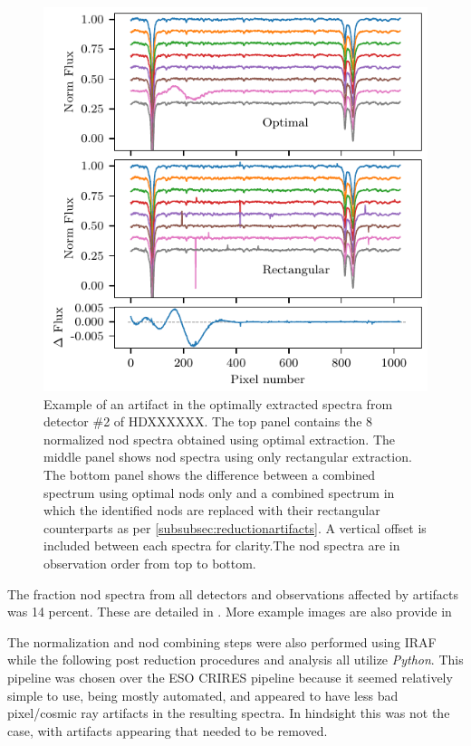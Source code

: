 \begin{figure}
    \centering
    \includegraphics[width=\hsize/2]{figures/reduction/Bad_pixel_replacement}
    \caption{Example of an artifact in the optimally extracted spectra from detector \#2 of HDXXXXXX. The top panel contains the 8 normalized nod spectra obtained using optimal extraction. The middle panel shows nod spectra using only rectangular extraction. The bottom panel shows the difference between a combined spectrum using optimal nods only and a combined spectrum in which the identified nods are replaced with their rectangular counterparts as per \ref{subsubsec:reductionartifacts}. A vertical offset is included between each spectra for clarity.The nod spectra are in observation order from top to bottom.}
    \label{fig:badpixelreplacement}
\end{figure}

The fraction nod spectra from all detectors and observations affected by artifacts was 14 percent. These are detailed in . More example images are also provide in  


The normalization and nod combining steps were also performed using IRAF while the following post reduction procedures and analysis all utilize \emph{Python}. This pipeline was chosen over the ESO CRIRES pipeline because it seemed relatively simple to use, being mostly automated, and appeared to have less bad pixel/cosmic ray artifacts in the resulting spectra. In hindsight this was not the case, with artifacts appearing that needed to be removed. 

